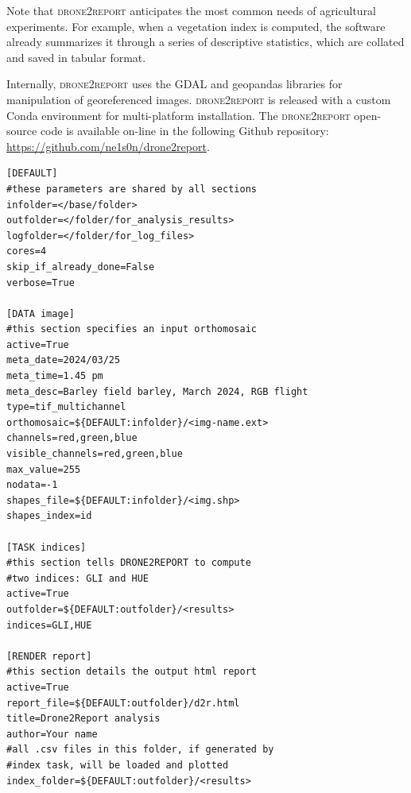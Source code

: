 \documentclass[drones,technicalnote,accept,pdftex,moreauthors]{Definitions/mdpi}
\begin{document}
Note that \textsc{drone2report} anticipates the most common needs of agricultural experiments. For example, when a vegetation index is computed, the software already summarizes it through a series of descriptive statistics, which are collated and saved in tabular format.

Internally, \textsc{drone2report} uses the GDAL \cite{GDALmanual} and geopandas \cite{kelsey_jordahl_2020_3946761} libraries for manipulation of georeferenced images. \textsc{drone2report} is released with a custom Conda environment for multi-platform installation.
The \textsc{drone2report} open-source code is available on-line in the following Github repository: \url{https://github.com/ne1s0n/drone2report}.

\begin{minipage}{\hsize}%
\lstset{frame=single,framexleftmargin=-1pt,framexrightmargin=-17pt,framesep=12pt,linewidth=0.98\textwidth,language=bash}%
\begin{lstlisting}[caption={Example of configuration file to run \textsc{drone2report}.
This takes the form of a standard .ini file, divided in sections (between
square brackets) and supporting comments (using the hash symbol)}, label={lst:config}]
[DEFAULT]
#these parameters are shared by all sections
infolder=</base/folder>
outfolder=</folder/for_analysis_results>
logfolder=</folder/for_log_files>
cores=4
skip_if_already_done=False
verbose=True

[DATA image]
#this section specifies an input orthomosaic
active=True
meta_date=2024/03/25
meta_time=1.45 pm
meta_desc=Barley field barley, March 2024, RGB flight
type=tif_multichannel
orthomosaic=${DEFAULT:infolder}/<img-name.ext>
channels=red,green,blue
visible_channels=red,green,blue
max_value=255 
nodata=-1
shapes_file=${DEFAULT:infolder}/<img.shp>
shapes_index=id

[TASK indices]
#this section tells DRONE2REPORT to compute 
#two indices: GLI and HUE
active=True
outfolder=${DEFAULT:outfolder}/<results>
indices=GLI,HUE

[RENDER report]
#this section details the output html report
active=True
report_file=${DEFAULT:outfolder}/d2r.html
title=Drone2Report analysis
author=Your name
#all .csv files in this folder, if generated by
#index task, will be loaded and plotted
index_folder=${DEFAULT:outfolder}/<results>

\end{lstlisting}
\end{minipage}
\end{document}

